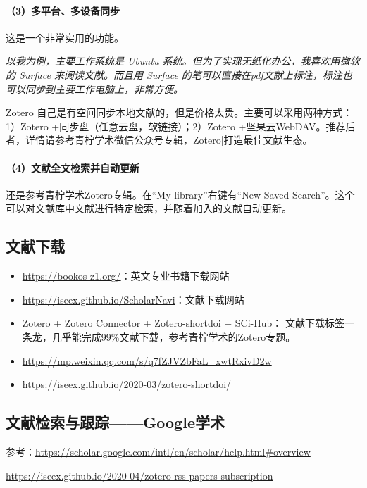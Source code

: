\paragraph{（3）多平台、多设备同步}
这是一个非常实用的功能。

\emph{以我为例，主要工作系统是 Ubuntu 系统。但为了实现无纸化办公，我喜欢用微软的 Surface 来阅读文献。而且用 Surface 的笔可以直接在pdf文献上标注，标注也可以同步到主要工作电脑上，非常方便。}

Zotero 自己是有空间同步本地文献的，但是价格太贵。主要可以采用两种方式：1）Zotero +同步盘（任意云盘，软链接）；2）Zotero +坚果云WebDAV。推荐后者，详情请参考青柠学术微信公众号专辑，Zotero|打造最佳文献生态。

\paragraph{（4）文献全文检索并自动更新}
还是参考青柠学术Zotero专辑。在“My library”右键有“New Saved Search”。这个可以对文献库中文献进行特定检索，并随着加入的文献自动更新。



\subsection{文献下载}
\begin{itemize}
\item \url{https://bookos-z1.org/}：英文专业书籍下载网站
\item \url{https://iseex.github.io/ScholarNavi}：文献下载网站
\item Zotero + Zotero Connector + Zotero-shortdoi + SCi-Hub： 文献下载标签一条龙，几乎能完成99\%文献下载，参考青柠学术的Zotero专题。
\end{itemize}

\begin{itemize}
\item \url{https://mp.weixin.qq.com/s/q7fZJVZbFaL_xwtRxivD2w}
\item \url{https://iseex.github.io/2020-03/zotero-shortdoi/}
\end{itemize}


\subsection{文献检索与跟踪——Google学术}
参考：\url{https://scholar.google.com/intl/en/scholar/help.html#overview}

\url{https://iseex.github.io/2020-04/zotero-rss-papers-subscription}



